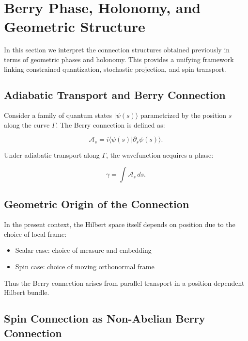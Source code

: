 \documentclass[11pt]{article}
\begin{document}
\section{Berry Phase, Holonomy, and Geometric Structure}

In this section we interpret the connection structures obtained previously in terms of geometric phases and holonomy. This provides a unifying framework linking constrained quantization, stochastic projection, and spin transport.

\subsection{Adiabatic Transport and Berry Connection}

Consider a family of quantum states $|\psi(s)\rangle$ parametrized by the position $s$ along the curve $\Gamma$. The Berry connection is defined as:

\begin{equation}
\mathcal{A}_s = i \langle \psi(s) | \partial_s \psi(s) \rangle.
\end{equation}

Under adiabatic transport along $\Gamma$, the wavefunction acquires a phase:

\begin{equation}
\gamma = \int \mathcal{A}_s \, ds.
\end{equation}

\subsection{Geometric Origin of the Connection}

In the present context, the Hilbert space itself depends on position due to the choice of local frame:

\begin{itemize}
\item Scalar case: choice of measure and embedding
\item Spin case: choice of moving orthonormal frame
\end{itemize}

Thus the Berry connection arises from parallel transport in a position-dependent Hilbert bundle.

\subsection{Spin Connection as Non-Abelian Berry Connection}
\end{document}
